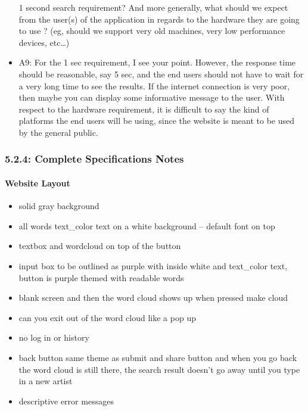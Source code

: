 \documentclass[]{article}
\begin{document}
\begin{itemize}
  1 second search requirement? And more generally, what should we expect
  from the user(s) of the application in regards to the hardware they
  are going to use ? (eg, should we support very old machines, very low
  performance devices, etc\ldots{})
\item
  A9: For the 1 sec requirement, I see your point. However, the response
  time should be reasonable, say 5 sec, and the end users should not
  have to wait for a very long time to see the results. If the internet
  connection is very poor, then maybe you can display some informative
  message to the user. With respect to the hardware requirement, it is
  difficult to say the kind of platforms the end users will be using,
  since the website is meant to be used by the general public.
\end{itemize}

\subsubsection{5.2.4: Complete Specifications
Notes}\label{complete-specifications-notes}

\paragraph{Website Layout}\label{website-layout}

\begin{itemize}
\itemsep1pt\parskip0pt
\item
  solid gray background
\item
  all words text\_color text on a white background -- default font on
  top
\item
  textbox and wordcloud on top of the button
\item
  input box to be outlined as purple with inside white and text\_color
  text, button is purple themed with readable words
\item
  blank screen and then the word cloud shows up when pressed make cloud
\item
  can you exit out of the word cloud like a pop up
\item
  no log in or history
\item
  back button same theme as submit and share button and when you go back
  the word cloud is still there, the search result doesn't go away until
  you type in a new artist
\item
  descriptive error messages
\end{itemize}
\end{document}
